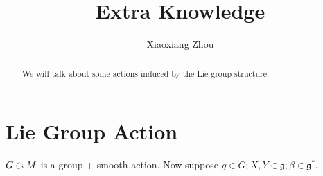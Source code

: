 \documentclass[11pt]{amsart}
\numberwithin{equation}{section}
\theoremstyle{plain}
\theoremstyle{plain}
\numberwithin{equation}{section}
\theoremstyle{remark}
\begin{document}
\date{}

\title
{Extra Knowledge}


\author{Xiaoxiang Zhou}
\address{School of Mathematical Sciences\\
University of Science and Technology of China\\
Hefei, 230026\\ P.R. China\\} 





\begin{abstract}
We will talk about some actions induced by the Lie group structure.
\end{abstract}



\maketitle


\section{Lie Group Action}
$G \text{ \rotatebox[origin=c]{270}{$\circlearrowleft$} } M$ is a group + smooth action. Now suppose $g \in G; X,Y \in \mathfrak{g}; \beta \in \mathfrak{g}^*.$
\end{document}
